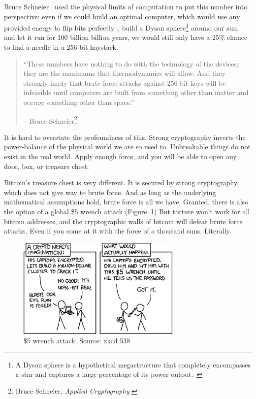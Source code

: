 Bruce Schneier~\cite{web:schneier} used the physical limits of computation to put this
number into perspective: even if we could build an optimal computer,
which would use any provided energy to flip bits perfectly~\cite{wiki:landauer}, build a
Dyson sphere\footnote{A Dyson sphere is a hypothetical megastructure that completely encompasses a star and captures a large percentage of its power output.~\cite{wiki:dyson}} around our sun, and let it run for 100 billion billion
years, we would still only have a $25\%$ chance to find a needle in a
256-bit haystack.

\begin{quotation}\begin{samepage}
\enquote{These numbers have nothing to do with the technology of the devices;
they are the maximums that thermodynamics will allow. And they
strongly imply that brute-force attacks against 256-bit keys will be
infeasible until computers are built from something other than matter
and occupy something other than space.}
\begin{flushright} -- Bruce Schneier\footnote{Bruce Schneier, \textit{Applied Cryptography} \cite{bruce-schneier}}
\end{flushright}\end{samepage}\end{quotation}


It is hard to overstate the profoundness of this. Strong cryptography
inverts the power-balance of the physical world we are so used to.
Unbreakable things do not exist in the real world. Apply enough force,
and you will be able to open any door, box, or treasure chest.

Bitcoin's treasure chest is very different. It is secured by strong
cryptography, which does not give way to brute force. And as long as the
underlying mathematical assumptions hold, brute force is all we have.
Granted, there is also the option of a global \$5 wrench attack (Figure~\ref{fig:xkcd-538})
But torture won't work for all bitcoin addresses, and the cryptographic
walls of bitcoin will defeat brute force attacks. Even if you come at it
with the force of a thousand suns. Literally.

\begin{figure}
  \centering
  \includegraphics[width=8cm]{assets/images/xkcd-538.png}
  \caption{\$5 wrench attack. Source: xkcd 538}
  \label{fig:xkcd-538}
\end{figure}

